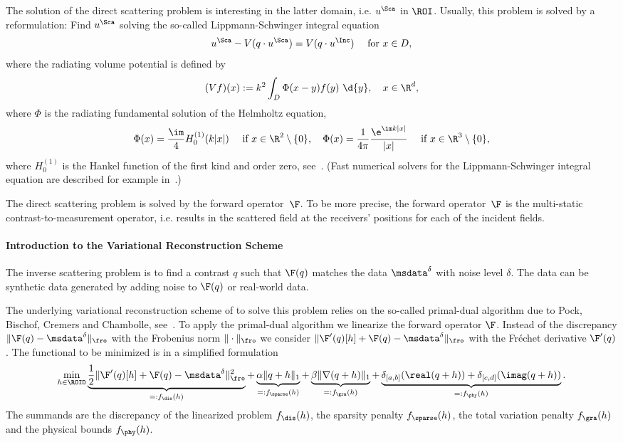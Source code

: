 \documentclass[a4paper]{article}
\begin{document}
The solution of the direct scattering problem is interesting in the latter domain, i.e. $u^\Sca$ in $\ROI$. Usually, this problem is solved by a reformulation: Find $u^\Sca$ solving the so-called Lippmann-Schwinger integral equation
\begin{equation}\label{eq:LSI}
 u^\Sca - V(q\cdot u^\Sca) = V(q\cdot u^\Inc) \quad \text{ for } x \in D,
\end{equation}
where the radiating volume potential is defined by
\begin{equation*}
 (Vf)(x) := k^2 \int_D \Phi(x-y)f(y)\ \d{y}, \quad x\in\R^d,
\end{equation*}
where $\Phi$ is the radiating fundamental solution of the Helmholtz equation,
\begin{equation}\label{eq:fundamental}
\Phi(x) = \frac{\im}{4} H_0^{(1)}(k|x|) \quad \text{ if } x \in \R^2\setminus\{0\},
\quad
\Phi(x) = \frac{1}{4\pi} \frac{\e^{\im k|x|}}{|x|} \quad \text{ if } x \in \R^3\setminus\{0\},
\end{equation}
where $H_0^{(1)}$ is the  Hankel function of the first kind and order zero, see~\cite[Ch.~9]{Abramowitz1965}. (Fast numerical solvers for the Lippmann-Schwinger integral equation are described for example in~\cite{Vainikko2000}.)

The direct scattering problem is solved by the forward operator~$\F$. To be more precise, the forward operator~$\F$ is the multi-static contrast-to-measurement operator, i.e. results in the scattered field at the receivers' positions for each of the incident fields. 

\paragraph{Introduction to the Variational Reconstruction Scheme} The inverse scattering problem is to find a contrast $q$ such that $\F(q)$ matches the data $\msdata^\delta$ with noise level $\delta$. The data can be synthetic data generated by adding noise to $\F(q)$ or real-world data.

The underlying variational reconstruction scheme of \IPscatt to solve this problem relies on the so-called primal-dual algorithm due to Pock, Bischof, Cremers and Chambolle, see~\cite{Pock2009, Chambolle2011}. To apply the primal-dual algorithm we linearize the forward operator $\F$.
Instead of the discrepancy $\|\F(q) - \msdata^\delta \|_\fro$ with the Frobenius norm $\|\cdot\|_\fro$ 
we consider 
$\|\F'(q)[h] + \F(q) - \msdata^\delta \|_\fro$ with the Fr\'echet derivative $\F'(q)$.
The functional to be minimized is in a simplified formulation
\begin{equation}\label{eq:minFuncSimple}
\min_{h \in \ROID} 
     \underbrace{
         \frac{1}{2}\|\F'(q)[h]+\F(q) - \msdata^\delta\|_\fro^2
         }_{=: f_\dis(h)}
   + \underbrace{\alpha \|q+h\|_1}_{=: f_\sparse(h)}
   + \underbrace{\beta \| \nabla (q+h) \|_1}_{=: f_\gra(h)}
   + \underbrace{
         \delta_{[a,b]}(\real(q+h) ) +
         \delta_{[c,d]}(\imag(q+h) )}_{=: f_\phy(h)}.
\end{equation}
The summands are the discrepancy of the linearized problem $f_\dis(h)$, the sparsity penalty $f_\sparse(h)$, the total variation penalty $f_\gra(h)$ and the physical bounds $f_\phy(h)$. 
\end{document}
